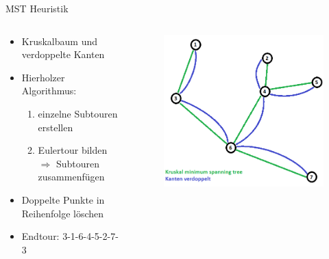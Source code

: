 \begin{frame}{MST Heuristik}    
  \begin{columns}
	  \begin{column}{0.5\textwidth}
	\begin{itemize}
		\item Kruskalbaum und verdoppelte Kanten
      \vspace{1cm}
      	\item Hierholzer Algorithmus:
        \begin{enumerate}
        	\item einzelne Subtouren erstellen
            \item Eulertour bilden $\Rightarrow$ Subtouren zusammenfügen
        \end{enumerate}
        \item Doppelte Punkte in Reihenfolge löschen
        \item Endtour: 3-1-6-4-5-2-7-3
	\end{itemize}
	  \end{column}
      \begin{column}{0.5\textwidth}
      	\vspace{-1.0cm}
        \begin{figure} 
        	\includegraphics[scale=0.30]{Kruskal_double_edges.png} \\
            \vspace{.2cm}

\end{figure}
\end{column}
\end{columns}
\end{frame}
